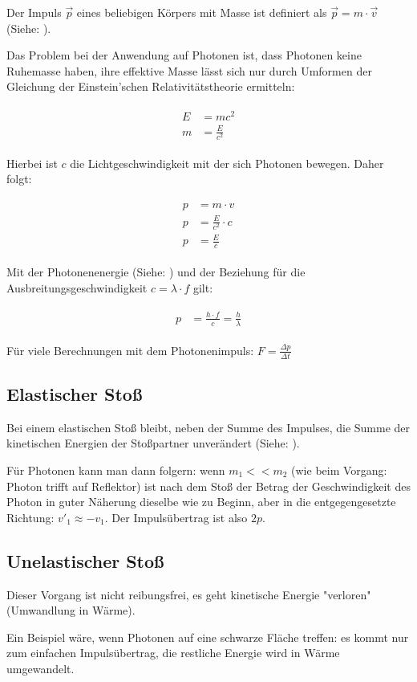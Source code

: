 Der Impuls $\vec{p}$ eines beliebigen Körpers mit Masse ist definiert als $\vec{p} = m \cdot \vec{v}$ (Siehe: ). 

Das Problem bei der Anwendung auf Photonen ist, dass Photonen keine Ruhemasse haben, ihre effektive Masse lässt sich nur durch Umformen der Gleichung der Einstein'schen Relativitätstheorie ermitteln:

\begin{align}
\begin{split}
	E &= mc^2 \\
	m &= \frac{E}{c^2}
\end{split}
\end{align}

\noindent Hierbei ist $c$ die Lichtgeschwindigkeit mit der sich Photonen bewegen. Daher folgt:

\begin{align}
\begin{split}
	p &= m \cdot v \\
	p &= \frac{E}{c^2} \cdot c \\
	p &= \frac{E}{c}
\end{split}
\end{align}

\noindent Mit der Photonenenergie (Siehe: ) und der Beziehung für die Ausbreitungsgeschwindigkeit $c=\lambda \cdot f$ gilt:

\begin{align}	\label{eq:Photonenimpuls}
\begin{split}
	p &= \frac{h \cdot f}{c} = \frac{h}{\lambda}
\end{split}
\end{align}

\begin{NiceToKnow}
	Für viele Berechnungen mit dem Photonenimpuls: $F = \frac{\Delta p}{\Delta t}$
\end{NiceToKnow}


\subsection{Elastischer Stoß}

Bei einem elastischen Stoß bleibt, neben der Summe des Impulses, die Summe der kinetischen Energien der Stoßpartner unverändert (Siehe: ).

Für Photonen kann man dann folgern: wenn $m_1 << m_2$ (wie beim Vorgang: Photon trifft auf Reflektor) ist nach dem Stoß der Betrag der Geschwindigkeit des Photon in guter Näherung dieselbe wie zu Beginn, aber in die entgegengesetzte Richtung: $v'_1 \approx -v_1$. Der Impulsübertrag ist also $2p$.


\subsection{Unelastischer Stoß}

Dieser Vorgang ist nicht reibungsfrei, es geht kinetische Energie "verloren" (Umwandlung in Wärme).

Ein Beispiel wäre, wenn Photonen auf eine schwarze Fläche treffen: es kommt nur zum einfachen Impulsübertrag, die restliche Energie wird in Wärme umgewandelt.
